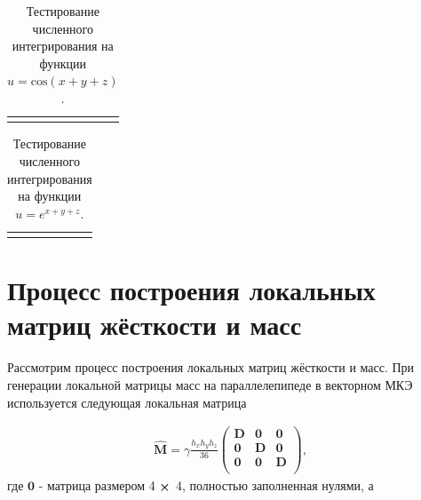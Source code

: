 \begin{table}
	\caption{Тестирование численного интегрирования на функции $u = \text{cos}(x + y + z)$.}
	\centering
	\small
	\begin{tabularx}{1.0\textwidth}{| >{\raggedright\arraybackslash}X | >{\raggedright\arraybackslash}X | >{\raggedright\arraybackslash}X |>{\raggedright\arraybackslash}X |>{\raggedright\arraybackslash}X |}
		\hline
		\centering{Аналитический результат} & \centering{Гаусс 2} & \centering{Гаусс 3} & \centering{Гаусс 4} & \centering{Гаусс 5} \tabularnewline \hline
		
		\centering{4.7666...} & \centering{4.7063579e+00}& \centering{4.7671091e+00} & \centering{4.7665835e+00} & \centering{4.7665859e+00} \tabularnewline \hline
		
	\end{tabularx}
	\label{tab:numIntegr6}
\end{table}

\begin{table}
	\caption{Тестирование численного интегрирования на функции $u = e^{x + y + z}$.}
	\centering
	\small
	\begin{tabularx}{1.0\textwidth}{| >{\raggedright\arraybackslash}X | >{\raggedright\arraybackslash}X | >{\raggedright\arraybackslash}X |>{\raggedright\arraybackslash}X |>{\raggedright\arraybackslash}X |}
		\hline
		\centering{Аналитический результат} & \centering{Гаусс 2} & \centering{Гаусс 3} & \centering{Гаусс 4} & \centering{Гаусс 5} \tabularnewline \hline
		
		\centering{12.9845...} & \centering{1.2857243e+01}& \centering{1.2983458e+01} & \centering{1.2984538e+01} & \centering{1.2984543e+01} \tabularnewline \hline
		
	\end{tabularx}
	\label{tab:numIntegr7}
\end{table}

\section{Процесс построения локальных матриц жёсткости и масс}

Рассмотрим процесс построения локальных матриц жёсткости и масс. При генерации локальной матрицы масс на параллелепипеде в векторном МКЭ используется следующая локальная матрица

\begin{equation} \label{eq_2_1}
	\begin{gathered}
		\hat{\textbf{M}} = \gamma \frac{h_x h_y h_z}{36} 
		\begin{pmatrix} 
			\textbf{D} & \textbf{0} & \textbf{0}\\
			\textbf{0} & \textbf{D} & \textbf{0}\\
			\textbf{0} & \textbf{0} & \textbf{D}\\
		\end{pmatrix},
	\end{gathered}
\end{equation}
где $\textbf{0}$ - матрица размером 4 $\cross$ 4, полностью заполненная нулями, а

